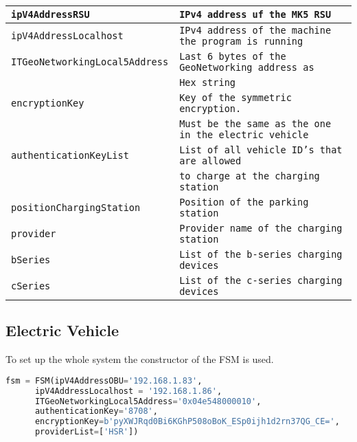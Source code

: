 \begin{tabular}{|l|l|}
	\hline 
	\texttt{ipV4AddressRSU} & \texttt{IPv4 address uf the MK5 RSU} \\
	\hline  
	\texttt{ipV4AddressLocalhost} & \texttt{IPv4 address of the machine the program is running} \\ 
	\hline 
	\texttt{ITGeoNetworkingLocal5Address} & \texttt{Last 6 bytes of the GeoNetworking address as} \\
										  &	\texttt{Hex string} \\ 
	\hline 
	\texttt{encryptionKey}  & \texttt{Key of the symmetric encryption.} \\ 
							& \texttt{Must be the same as the one in the electric vehicle} \\ 
	\hline 
	\texttt{authenticationKeyList} & \texttt{List of all vehicle ID's that are allowed} \\
								   & \texttt{to charge at the charging station} \\ 
	\hline 
	\texttt{positionChargingStation} & \texttt{Position of the parking station} \\ 
	\hline 
	\texttt{provider} & \texttt{Provider name of the charging station} \\ 
	\hline 
	\texttt{bSeries} & \texttt{List of the b-series charging devices} \\ 
	\hline 
	\texttt{cSeries} & \texttt{List of the c-series charging devices} \\ 
	\hline 
\end{tabular}


\subsection{Electric Vehicle}

To set up the whole system the constructor of the FSM is used.
\begin{lstlisting}[language=Python]
fsm = FSM(ipV4AddressOBU='192.168.1.83',
	  ipV4AddressLocalhost = '192.168.1.86',
	  ITGeoNetworkingLocal5Address='0x04e548000010',
	  authenticationKey='8708',
	  encryptionKey=b'pyXWJRqd0Bi6KGhP508oBoK_ESp0ijh1d2rn37QG_CE=',
	  providerList=['HSR'])
\end{lstlisting}


